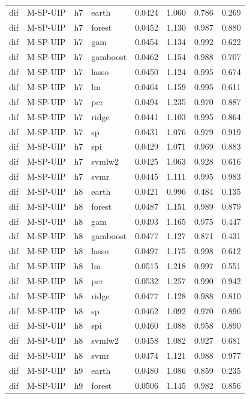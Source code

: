 \begin{ThreePartTable}
\begin{longtable}[t]{llclcccc}
dif & M-SP-UIP & h7 & earth & 0.0424 & 1.060 & 0.786 & 0.269\\
dif & M-SP-UIP & h7 & forest & 0.0452 & 1.130 & 0.987 & 0.880\\
dif & M-SP-UIP & h7 & gam & 0.0454 & 1.134 & 0.992 & 0.622\\
dif & M-SP-UIP & h7 & gamboost & 0.0462 & 1.154 & 0.988 & 0.707\\
dif & M-SP-UIP & h7 & lasso & 0.0450 & 1.124 & 0.995 & 0.674\\
dif & M-SP-UIP & h7 & lm & 0.0464 & 1.159 & 0.995 & 0.611\\
dif & M-SP-UIP & h7 & pcr & 0.0494 & 1.235 & 0.970 & 0.887\\
dif & M-SP-UIP & h7 & ridge & 0.0441 & 1.103 & 0.995 & 0.864\\
dif & M-SP-UIP & h7 & sp & 0.0431 & 1.076 & 0.979 & 0.919\\
dif & M-SP-UIP & h7 & spi & 0.0429 & 1.071 & 0.969 & 0.883\\
dif & M-SP-UIP & h7 & svmlw2 & 0.0425 & 1.063 & 0.928 & 0.616\\
dif & M-SP-UIP & h7 & svmr & 0.0445 & 1.111 & 0.995 & 0.983\\
\addlinespace
dif & M-SP-UIP & h8 & earth & 0.0421 & 0.996 & 0.484 & 0.135\\
dif & M-SP-UIP & h8 & forest & 0.0487 & 1.151 & 0.989 & 0.879\\
dif & M-SP-UIP & h8 & gam & 0.0493 & 1.165 & 0.975 & 0.447\\
dif & M-SP-UIP & h8 & gamboost & 0.0477 & 1.127 & 0.871 & 0.431\\
dif & M-SP-UIP & h8 & lasso & 0.0497 & 1.175 & 0.998 & 0.612\\
dif & M-SP-UIP & h8 & lm & 0.0515 & 1.218 & 0.997 & 0.551\\
dif & M-SP-UIP & h8 & pcr & 0.0532 & 1.257 & 0.990 & 0.942\\
dif & M-SP-UIP & h8 & ridge & 0.0477 & 1.128 & 0.988 & 0.810\\
dif & M-SP-UIP & h8 & sp & 0.0462 & 1.092 & 0.970 & 0.896\\
dif & M-SP-UIP & h8 & spi & 0.0460 & 1.088 & 0.958 & 0.890\\
dif & M-SP-UIP & h8 & svmlw2 & 0.0458 & 1.082 & 0.927 & 0.681\\
dif & M-SP-UIP & h8 & svmr & 0.0474 & 1.121 & 0.988 & 0.977\\
\addlinespace
dif & M-SP-UIP & h9 & earth & 0.0480 & 1.086 & 0.859 & 0.235\\
dif & M-SP-UIP & h9 & forest & 0.0506 & 1.145 & 0.982 & 0.856\\

\end{longtable}
\end{ThreePartTable}
